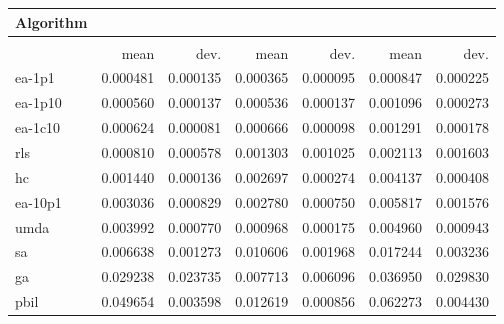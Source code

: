 \begin{tabular}{@{} l *{6}{>{{}}N{1}{2}} @{}}
\toprule
{Algorithm} &  \\
\midrule
&  &  &  \\
\midrule
& {mean} & {dev.} & {mean} & {dev.} & {mean} & {dev.} \\
\midrule
ea-1p1 & 0.000481 & 0.000135 & 0.000365 & 0.000095 & 0.000847 & 0.000225 \\
ea-1p10 & 0.000560 & 0.000137 & 0.000536 & 0.000137 & 0.001096 & 0.000273 \\
ea-1c10 & 0.000624 & 0.000081 & 0.000666 & 0.000098 & 0.001291 & 0.000178 \\
rls & 0.000810 & 0.000578 & 0.001303 & 0.001025 & 0.002113 & 0.001603 \\
hc & 0.001440 & 0.000136 & 0.002697 & 0.000274 & 0.004137 & 0.000408 \\
ea-10p1 & 0.003036 & 0.000829 & 0.002780 & 0.000750 & 0.005817 & 0.001576 \\
umda & 0.003992 & 0.000770 & 0.000968 & 0.000175 & 0.004960 & 0.000943 \\
sa & 0.006638 & 0.001273 & 0.010606 & 0.001968 & 0.017244 & 0.003236 \\
ga & 0.029238 & 0.023735 & 0.007713 & 0.006096 & 0.036950 & 0.029830 \\
pbil & 0.049654 & 0.003598 & 0.012619 & 0.000856 & 0.062273 & 0.004430 \\
\bottomrule
\end{tabular}
